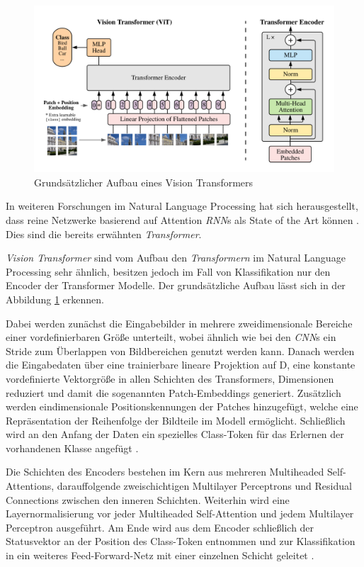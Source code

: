 \documentclass[twoside,a4paper]{IEEEtran}
\begin{document}
\begin{figure}[!htb]
	\centering
	\includegraphics[width=2.1\columnwidth]{vitimg}
	\caption{Grundsätzlicher Aufbau eines Vision Transformers \cite[S.3]{VIT}}
	\label{vitimg}
\end{figure}

In weiteren Forschungen im Natural Language Processing hat sich herausgestellt, dass reine Netzwerke basierend auf Attention \emph{RNN}s als State of the Art können \cite[S.2]{TRANSFORMERS}. Dies sind die bereits erwähnten \emph{Transformer}.

\emph{Vision Transformer} sind vom Aufbau den \emph{Transformern} im Natural Language Processing sehr ähnlich, besitzen jedoch im Fall von Klassifikation nur den Encoder der Transformer Modelle. Der grundsätzliche Aufbau lässt sich in der Abbildung \ref{vitimg} erkennen.

Dabei werden zunächst die Eingabebilder in mehrere zweidimensionale Bereiche einer vordefinierbaren Größe unterteilt, wobei ähnlich wie bei den \emph{CNN}s ein Stride zum Überlappen von Bildbereichen genutzt werden kann. Danach werden die Eingabedaten über eine trainierbare lineare Projektion auf D, eine konstante vordefinierte Vektorgröße in allen Schichten des Transformers, Dimensionen reduziert und damit die sogenannten Patch-Embeddings generiert. Zusätzlich werden eindimensionale Positionskennungen der Patches hinzugefügt, welche eine Repräsentation der Reihenfolge der Bildteile im Modell ermöglicht. Schließlich wird an den Anfang der Daten ein spezielles Class-Token für das Erlernen der vorhandenen Klasse angefügt \cite[S.3]{VIT}. 

Die Schichten des Encoders bestehen im Kern aus mehreren Multiheaded Self-Attentions, darauffolgende zweischichtigen Multilayer Perceptrons und Residual Connections zwischen den inneren Schichten. Weiterhin wird eine Layernormalisierung vor jeder Multiheaded Self-Attention und jedem Multilayer Perceptron ausgeführt. Am Ende wird aus dem Encoder schließlich der Statusvektor an der Position des Class-Token entnommen und zur Klassifikation in ein weiteres Feed-Forward-Netz mit einer einzelnen Schicht geleitet \cite[S.3-4]{VIT}. 
\end{document}
